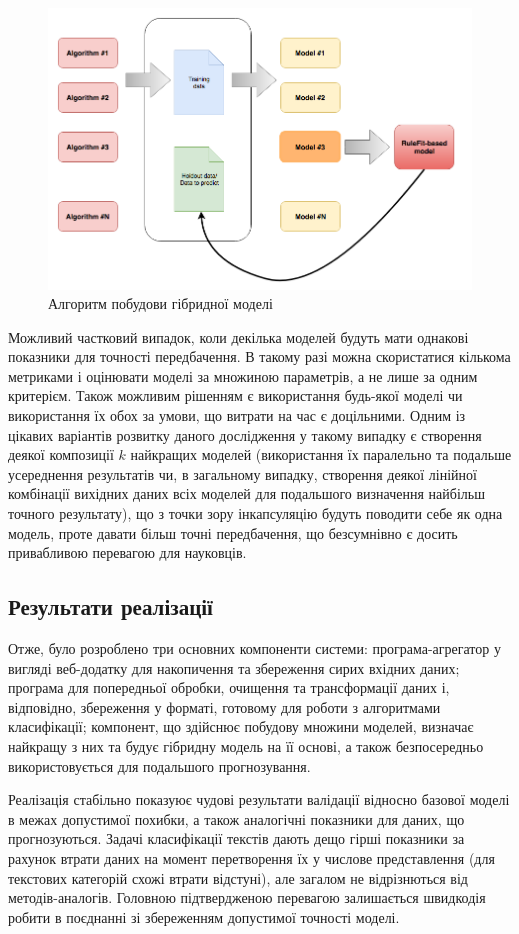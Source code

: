 \begin{figure}[h!]
  \includegraphics[width=\linewidth]{figures/alg_model.png}
  \caption{Алгоритм побудови гібридної моделі}
  \label{fig:alg_model}
\end{figure}

Можливий частковий випадок, коли декілька моделей будуть мати однакові показники для точності передбачення. В такому разі можна скористатися кількома метриками і оцінювати моделі за множиною параметрів, а не лише за одним критерієм. Також можливим рішенням є використання будь-якої моделі чи використання їх обох за умови, що витрати на час є доцільними. Одним із цікавих варіантів розвитку даного дослідження у такому випадку є створення деякої композиції $k$ найкращих моделей (використання їх паралельно та подальше усереднення результатів чи, в загальному випадку, створення деякої лінійної комбінації вихідних даних всіх моделей для подальшого визначення найбільш точного результату), що з точки зору інкапсуляцію будуть поводити себе як одна модель, проте давати більш точні передбачення, що безсумнівно є досить привабливою перевагою для науковців.

\subsection{Результати реалізації}
Отже, було розроблено три основних компоненти системи: програма-агрегатор у вигляді веб-додатку для накопичення та збереження сирих вхідних даних; програма для попередньої обробки, очищення та трансформації даних і, відповідно, збереження у форматі, готовому для роботи з алгоритмами класифікації; компонент, що здійснює побудову множини моделей, визначає найкращу з них та будує гібридну модель на її основі, а також безпосередньо використовується для подальшого прогнозування.

Реалізація стабільно показуює чудові результати валідації відносно базової моделі в межах допустимої похибки, а також аналогічні показники для даних, що прогнозуються. Задачі класифікації текстів дають дещо гірші показники за рахунок втрати даних на момент перетворення їх у числове представлення (для текстових категорій схожі втрати відстуні), але загалом не відрізнються від методів-аналогів. Головною підтвердженою перевагою залишається швидкодія робити в поєднанні зі збереженням допустимої точності моделі.